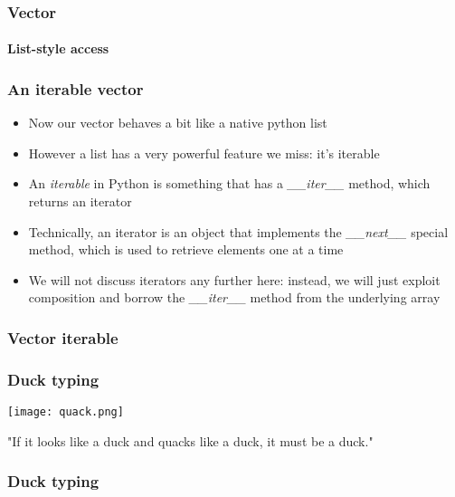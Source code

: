 \documentclass[9pt]{beamer}
\begin{document}
\begin{frame}
  \frametitle{Vector}
  \framesubtitle{List-style access}
  
\end{frame}


\begin{frame}
  \frametitle{An iterable vector}

  \begin{itemize}
    \item Now our vector behaves a bit like a native python list
    \medskip
    \item However a list has a very powerful feature we miss: it's \alert{iterable}
    \medskip
    \item An \emph{iterable} in Python is something that has a
          \emph{\_\_iter\_\_} method, which returns an \alert{iterator}
    \medskip
    \item Technically, an iterator is an object that implements the
          \emph{\_\_next\_\_} special method, which is used to retrieve elements
          one at a time
    \medskip
    \item We will not discuss iterators any further here: instead, we will just
          exploit composition and borrow the \emph{\_\_iter\_\_} method from the
          underlying array
  \end{itemize}

\end{frame}

\begin{frame}
  \frametitle{Vector iterable}
  
\end{frame}


\begin{frame}
  \frametitle{Duck typing}

  \centering
  \texttt{[image: quack.png]}

  \bigskip

  \centering
  "If it looks like a duck and quacks like a duck, it must be a duck."

\end{frame}


\begin{frame}
  \frametitle{Duck typing}
  
\end{frame}
\end{document}
